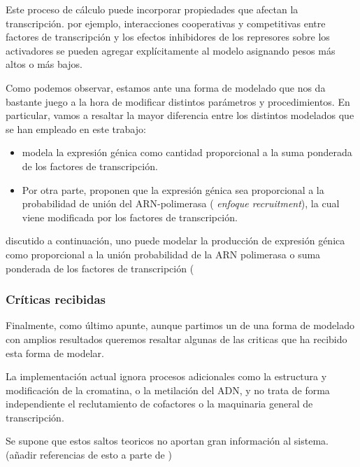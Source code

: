  
 Este proceso de cálculo puede incorporar propiedades que afectan la transcripción. por ejemplo, interacciones cooperativas y competitivas entre factores de transcripción y los efectos inhibidores de los represores sobre los activadores se pueden agregar explícitamente al modelo asignando pesos más altos o más bajos.
 
 Como podemos observar, estamos ante una forma de modelado que nos da bastante juego a la hora de modificar distintos parámetros y procedimientos. En particular, vamos a resaltar la mayor diferencia entre los distintos modelados que se han empleado en este trabajo:
 \begin{itemize}
 	\item \cite{schaffer} modela la expresión génica como cantidad proporcional a la suma ponderada de los factores de transcripción.
 	\item Por otra parte, \cite{cambon1} proponen que la expresión génica sea proporcional a la probabilidad de unión del ARN-polimerasa (\textit{ enfoque recruitment}), la cual viene modificada por los factores de transcripción.
 		
 		
 	\end{itemize}
 discutido a continuación, uno puede modelar la producción de expresión génica como proporcional a la unión
 probabilidad de la ARN polimerasa o suma ponderada de los factores de transcripción (
 
 
 
 
 \subsubsection{Críticas recibidas}
 
 
 Finalmente, como último apunte, aunque partimos un de una forma de modelado con amplios resultados queremos resaltar algunas de las criticas que ha recibido esta forma de modelar.
 
 La implementación actual ignora procesos adicionales como la estructura y modificación de la cromatina, o la metilación del ADN, y no trata de forma independiente el reclutamiento de cofactores o la maquinaria general de transcripción.
 
  Se supone que estos saltos teoricos no aportan gran información al sistema. (añadir referencias de esto a parte de \cite{ay2011mathematical})